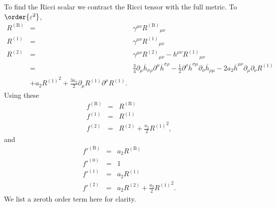 \documentclass[aps,prd,reprint,showpacs]{revtex4-1}
\newcommand{\recip}[1]{\ensuremath{\frac{1}{#1}}}
\begin{document}
To find the Ricci scalar we contract the Ricci tensor with the full metric. To $\order{\varepsilon^2}$,
\begin{eqnarray}
R^{(\text{B})} & = & \gamma^{\mu\nu} {R^{(\text{B})}}_{\mu\nu} \\
R^{(1)} & = & \gamma^{\mu\nu} {R^{(1)}}_{\mu\nu} \\
R^{(2)} & = & \gamma^{\mu\nu} {R^{(2)}}_{\mu\nu} - h^{\mu\nu} {R^{(1)}}_{\mu\nu} \nonumber \\
 & = & \frac{3}{4}\partial_\mu\overline{h}_{\sigma\rho}\partial^\mu\overline{h}^{\sigma\rho} - \recip{2} \partial^\rho\overline{h}^{\sigma\mu}\partial_\sigma\overline{h}_{\rho\mu} - 2a_2 \overline{h}^{\mu\nu}\partial_\mu\partial_\nu R^{(1)} \nonumber \\
 & + {} a_2 {R^{(1)}}^2 + \frac{3a_2}{2}\partial_\mu R^{(1)} \partial^\mu R^{(1)}.
\end{eqnarray}
Using these
\begin{eqnarray}
f^{(\text{B})} & = & R^{(\text{B})} \\
f^{(1)} & = & R^{(1)} \\
f^{(2)} & = & R^{(2)} + \frac{a_2}{2}{R^{(1)}}^2,
\end{eqnarray}
and
\begin{eqnarray}
f'^{(\text{B})} & = & a_2 R^{(\text{B})} \\
f'^{(0)} & = & 1 \\
f'^{(1)} & = & a_2 R^{(1)} \\
f'^{(2)} & = & a_2 R^{(2)} + \frac{a_3}{2}{R^{(1)}}^2.
\end{eqnarray}
We list a zeroth order term here for clarity.
\end{document}
